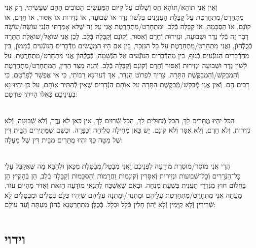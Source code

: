 \documentclass[twoside, openany, parskip=half, 11pt]{book}
\begin{document}
וְֿאֵין אֲנִי תוׂהֵא/תוׂהָא חַס וְֿשָׁלוׂם עַל קִיּוּם הַמַּעֲשִׂים הַטוׂבִים הָהֵם שֶׁעָשִׂיתִי, רַק אֲנִי מִתְחָרֵט/מִתְחָרֶטֶת עַל קַבָּלַת הָעִנְיָנִים בִּלְשׁוׂן נֶדֶר אוׂ שְֿׁבוּעָה, אוׂ נְֿזִירוּת אוׂ אִסּוּר, אוׂ חֵרֶם, אוׂ קוׂנָם, אוׂ הַסְכָּמָה, אוׂ קַבָּלָה בְּֿלֵב. וּמִתְחָרֵט/מִתְחָרֶטֶת אֲנִי עַל זֶה שֶׁלּא אָמַרְתִּי הִנְֿנִי עוׂשֶׂה/עוׂשָׂה דָבָר זֶה בְּֿלִי נֶדֶר וּשְׁבוּעָה, וּנְזִירוּת וְֿחֵרֶם וְֿאִסּוּר, וְֿקוׂנָם וְֿקַבָּלָה בְּֿלֵב. לָכֵן אֲנִי שׁוׂאֵל/שׁוׂאֶלֶת הַתָּרָה בְּֿכֻלְּֿהוׂן, וַאֲנִי מִתְחָרֵט/מִתְחָרֶטֶת עַל כָּל הַנִּזְכָּר, בֵּין אִם הָיוּ הַמַּעֲשִׂים מִדְּֿבָרִים הַנּוׂגְֿעִים בְּֿמָמוׂן, בֵּין מֵהַדְּֿבָרִים הַנּוׂגְֿעִים בְּֿגוּף, בֵּין מֵהַדְּֿבָרִים הַנּוׂגְֿעִים אֶל הַנְּֿשָׁמָה, בְּֿכֻלְּֿהוׂן אֲנִי מִתְחָרֵט/מִתְחָרֶטֶת, עַל לְֿשׁוׂן נֶדֶר וּשְׁבוּעָה וּנְזִירוּת וְֿאִסּוּר וְֿחֵרֶם וְֿקוׂנָם וְֿקַבָּלָה בְֿלֵב. וְֿהִנֵּה מִצַּד הַדִּין, הַמִּתְחָרֵט/מִתְחָרֶטֶת וְֿהַמְבַקֵּשׁ/וְֿהַמְבַקֶּשֶׁת הַתָּרָה, צָרִיךְ לִפְרוׂט הַנֶּדֶר, אַךְ דְּֿעוּ־נָא רַבּוׂתַי, כִּי אִי אֶפְשָׁר לְֿפָרְֿטָם, כִּי רַבִּים הֵם. וְֿאֵין אֲנִי מְֿבַקֵּשׁ/מְֿבַקֶּשֶׁת הַתָּרָה עַל אוׂתָם הַנְּֿדָרִים שֶׁאֵין לְֿהַתִּיר אוׂתָם, עַל כֵּן יִהְיוּ־נָא בְֿעֵינֵיכֶם כְּֿאִלּוּ הָיִיתִי פוׂרְֿטָם:

\\
הַכּל יִהְיוּ מֻתָּרִים לָךְ, הַכּל מְֿחוּלִים לָךְ, הַכּל שְֿׁרוּיִם לָךְ, אֵין כַּאן לֺא נֶדֶר, וְֿלֺא שְֿׁבוּעָה, וְֿלֺא נְֿזִירוּת, וְֿלֺא חֵרֶם, וְֿלֺא אִסָּר וְֿלֺא קוׂנָם. יֵשׁ כַּאן מְֿחִילָה סְֿלִיחָה וְֿכַפָּרָה. וּכְשֵׁם שֶׁמַּתִּירִים הַבֵּית דִּין שֶׁל מַטָּה כַּךְ יִהְיוּ מֻתָּרִים מִבֵּית דִּין שֶׁל מַעְלָה:

\\
הֲרֵי אֲנִי מוֺסֵר/מוֺסֶרֶת מוׂדָעָה לִפְנֵיכֶם וַאֲנִי מְֿבַטֵּל/מְֿבַטֶּלֶת מִכַּאן וּלְהַבָּא מַה שֶּׁאֲקַבֵּל עָלַי כׇּל־הַנְּֿדָרִים וְֿכׇל־שְֿׁבוּעוׂת וּנְזִירוּת וְֿאִסָּרִין וְֿקוׂנָמוׂת וַחֲרָמוׂת וְֿהַסְכָּמוׂת וְֿקַבָּלָה בְֿלֵב, הֵן בְּֿהָקִיץ הֵן בַּחֲלוׂם חוּץ מִנִּדְרֵי תַעֲנִית בִּשְׁעַת מִנְחָה. וּבְאִם שֶׁאֶשְׁכַּח לִתְנַאי מוׂדָעָה הַזּאת וְֿאֶדּׂר מֵהַיּוׂם עוׂד, מֵעַתָּה אֲנִי מִתְחָרֵט/מִתְחָרֶטֶת עֲלֵיהֶם וּמַתְנֶה/וּמַתְנָה עֲלֵיהֶם שֶׁיִּהְיוּ כֻּלָּם בְּֿטֵלִים וּמְבֻטָּלִים לָא שְֿׁרִירִין וְֿלָא קַיָּמִין וְֿלָא יְֿהוׂן חָלִין כְּֿלָל וּכְלָל. בְּֿכֻלָּן מִתְחָרַטְנָא בְֿהוׂן מֵעַתָּה וְֿעַד עוׂלָם:

\vfill
\sepline




\chapter[וידוי]{ וידוי }
\end{document}
